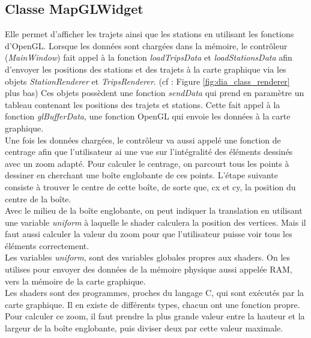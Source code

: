 \documentclass[12pt]{article}
\begin{document}
		\subsection{Classe MapGLWidget}
		Elle permet d’afficher les trajets ainsi que les stations en utilisant les fonctions d’OpenGL. Lorsque les données sont chargées dans la mémoire, le contrôleur (\textit{MainWindow}) fait appel à la fonction \textit{loadTripsData} et \textit{loadStationsData} afin d’envoyer les positions des stations et des trajets à la carte graphique via les objets \textit{StationRenderer} et \textit{TripsRenderer}. (cf : Figure \ref{fig:dia_class_renderer} plus bas) Ces objets possèdent une fonction \textit{sendData} qui prend en paramètre
		un tableau contenant les positions des trajets et stations. Cette fait appel à la fonction
		\textit{glBufferData}, une fonction OpenGL qui envoie les données à la carte graphique.\\

		Une fois les données chargées, le contrôleur va aussi appelé une fonction de centrage afin que l’utilisateur ai une vue sur l’intégralité des éléments dessinés avec un zoom adapté.
Pour calculer le centrage, on parcourt tous les points à dessiner en cherchant une boîte englobante de ces points. L’étape suivante consiste à trouver le centre de cette boîte, de sorte que, cx et cy, la position du centre de la boîte.\\

	Avec le milieu de la boîte englobante, on peut indiquer la translation en utilisant une variable
	\textit{uniform} à laquelle le shader calculera la position des vertices. Mais il faut aussi calculer la valeur du zoom pour que l’utilisateur puisse voir tous les éléments correctement.\\
	
	Les variables \textit{uniform}, sont des variables globales propres aux shaders. On les utilises
	pour envoyer des données de la mémoire physique aussi appelée RAM, vers la mémoire de la carte
	graphique.\\
	
	Les shaders sont des programmes, proches du langage C, qui sont exécutés par la carte graphique. Il
	en existe de différents types, chacun ont une fonction propre.\\

	Pour calculer ce zoom, il faut prendre la plus grande valeur entre la hauteur et la largeur de la boîte englobante, puis diviser deux par cette valeur maximale.\\
\end{document}
